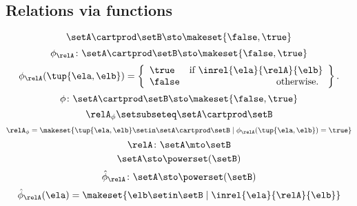 \begin{forslides}
    \subsection{Relations via functions}

    \begin{equation}\label{eq:slides_session2_110}
        \setA \cartprod \setB \sto \makeset{ \false, \true }
    \end{equation}
    \begin{equation}\label{eq:slides_session2_111}
        \phi_{\relA} \colon \setA \cartprod \setB \sto \makeset{ \false, \true }
    \end{equation}
    \begin{equation}\label{eq:slides_session2_112}
        \phi_{\relA}(\tup{\ela, \elb}) =
        \left\{\begin{array}{lr}
            \true  & \text{if } \inrel{\ela}{\relA}{\elb} \\
            \false & \text{otherwise.
            }
        \end{array}
        \right\}.
    \end{equation}
    \begin{equation}\label{eq:slides_session2_113}
        \phi\colon \setA \cartprod \setB \sto \makeset{ \false, \true }
    \end{equation}
    \begin{equation}\label{eq:slides_session2_114}
        \relA_{\phi} \setsubseteq \setA \cartprod \setB
    \end{equation}
    \begin{equation}\label{eq:slides_session2_115}
        \relA_{\phi} = \makeset{ \tup{\ela, \elb} \setin \setA \cartprod \setB \mid \phi_{\relA}(\tup{\ela, \elb}) = \true }
    \end{equation}
    \begin{equation}\label{eq:slides_session2_116}
        \relA \colon \setA \mto \setB
    \end{equation}
    \begin{equation}\label{eq:slides_session2_117}
        \setA  \sto \powerset (\setB)
    \end{equation}
    \begin{equation}\label{eq:slides_session2_118}
        \hat \phi_{\relA} \colon \setA \sto \powerset (\setB)
    \end{equation}
    \begin{equation}\label{eq:slides_session2_119}
        \hat \phi_{\relA} (\ela) = \makeset{ \elb \setin \setB \mid \inrel{\ela}{\relA}{\elb}}

\end{equation}
\end{forslides}
